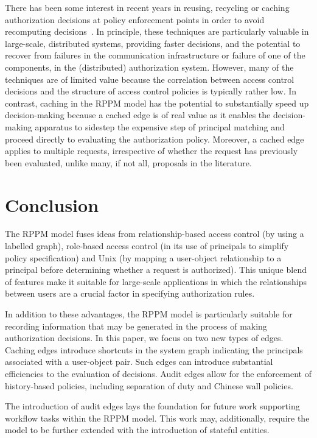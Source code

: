 \documentclass{article}
\begin{document}
There has been some interest in recent years in reusing, recycling or caching authorization decisions at policy enforcement points in order to avoid recomputing decisions~\cite{BordersZP05,KohlerBS09,KohlerF09,WeiCB11}.
In principle, these techniques are particularly valuable in large-scale, distributed systems, providing faster decisions, and the potential to recover from failures in the communication infrastructure or failure of one of the components, in the (distributed) authorization system.
However, many of the techniques are of limited value because the correlation between access control decisions and the structure of access control policies is typically rather low.
In contrast, caching in the RPPM model has the potential to substantially speed up decision-making because a cached edge is of real value as it enables the decision-making apparatus to sidestep the expensive step of principal matching and proceed directly to evaluating the authorization policy.
Moreover, a cached edge applies to multiple requests, irrespective of whether the request has previously been evaluated, unlike many, if not all, proposals in the literature.

\section{Conclusion}\label{sec:conclusion}

The RPPM model fuses ideas from relationship-based access control (by using a labelled graph), role-based access control (in its use of principals to simplify policy specification) and Unix (by mapping a user-object relationship to a principal before determining whether a request is authorized).
This unique blend of features make it suitable for large-scale applications in which the relationships between users are a crucial factor in specifying authorization rules.

In addition to these advantages, the RPPM model is particularly suitable for recording information that may be generated in the process of making authorization decisions.
In this paper, we focus on two new types of edges.
Caching edges introduce shortcuts in the system graph indicating the principals associated with a user-object pair.
Such edges can introduce substantial efficiencies to the evaluation of decisions.
Audit edges allow for the enforcement of history-based policies, including separation of duty and Chinese wall policies.

The introduction of audit edges lays the foundation for future work supporting workflow tasks within the RPPM model.
This work may, additionally, require the model to be further extended with the introduction of stateful entities.



\end{document}
